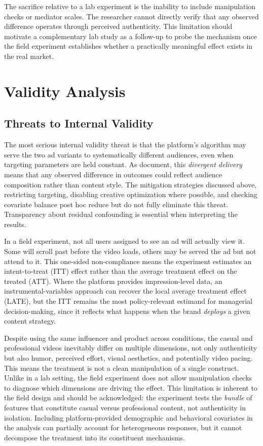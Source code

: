 \documentclass[10pt]{article}
\begin{document}
The sacrifice relative to a lab experiment is the inability to include manipulation checks or mediator scales. The researcher cannot directly verify that any observed difference operates through perceived authenticity. This limitation should motivate a complementary lab study as a follow-up to probe the mechanism once the field experiment establishes whether a practically meaningful effect exists in the real market.

\section{Validity Analysis}

\subsection{Threats to Internal Validity}

The most serious internal validity threat is that the platform's algorithm may serve the two ad variants to systematically different audiences, even when targeting parameters are held constant. As \cite{braun2020} document, this \textit{divergent delivery} means that any observed difference in outcomes could reflect audience composition rather than content style. The mitigation strategies discussed above, restricting targeting, disabling creative optimization where possible, and checking covariate balance post hoc reduce but do not fully eliminate this threat. Transparency about residual confounding is essential when interpreting the results.

In a field experiment, not all users assigned to see an ad will actually view it. Some will scroll past before the video loads, others may be served the ad but not attend to it. This one-sided non-compliance means the experiment estimates an intent-to-treat (ITT) effect rather than the average treatment effect on the treated (ATT). Where the platform provides impression-level data, an instrumental-variables approach can recover the local average treatment effect (LATE), but the ITT remains the most policy-relevant estimand for managerial decision-making, since it reflects what happens when the brand \textit{deploys} a given content strategy.

Despite using the same influencer and product across conditions, the casual and professional videos inevitably differ on multiple dimensions, not only authenticity but also humor, perceived effort, visual aesthetics, and potentially video pacing. This means the treatment is not a clean manipulation of a single construct. Unlike in a lab setting, the field experiment does not allow manipulation checks to diagnose which dimensions are driving the effect. This limitation is inherent to the field design and should be acknowledged: the experiment tests the \textit{bundle} of features that constitute casual versus professional content, not authenticity in isolation. Including platform-provided demographic and behavioral covariates in the analysis can partially account for heterogeneous responses, but it cannot decompose the treatment into its constituent mechanisms.
\end{document}

